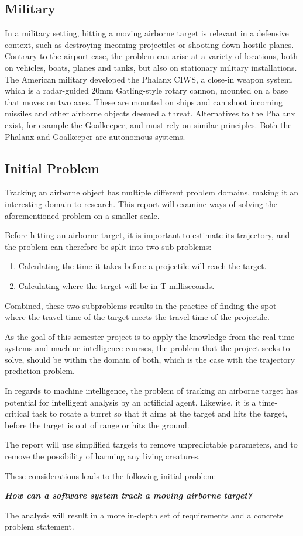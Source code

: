 \subsection{Military}
In a military setting, hitting a moving airborne target is relevant in a defensive context, such as destroying incoming projectiles or shooting down hostile planes.
Contrary to the airport case, the problem can arise at a variety of locations, both on vehicles, boats, planes and tanks, but also on stationary military installations.
The American military developed the Phalanx CIWS, a close-in weapon system, which is a radar-guided 20mm Gatling-style rotary cannon, mounted on a base that moves on two axes.
These are mounted on ships and can shoot incoming missiles and other airborne objects deemed a threat.
Alternatives to the Phalanx exist, for example the Goalkeeper, and must rely on similar principles.
Both the Phalanx and Goalkeeper are autonomous systems.

\subsection{Initial Problem}
Tracking an airborne object has multiple different problem domains, making it an interesting domain to research.
This report will examine ways of solving the aforementioned problem on a smaller scale.

Before hitting an airborne target, it is important to estimate its trajectory, and the problem can therefore be split into two sub-problems:
\begin{enumerate}
  \item Calculating the time it takes before a projectile will reach the target.
  \item Calculating where the target will be in T milliseconds.
\end{enumerate}
Combined, these two subproblems results in the practice of finding the spot where the travel time of the target meets the travel time of the projectile.

As the goal of this semester project is to apply the knowledge from the real time systems and machine intelligence courses, the problem that the project seeks to solve, should be within the domain of both, which is the case with the trajectory prediction problem.

In regards to machine intelligence, the problem of tracking an airborne target has potential for intelligent analysis by an artificial agent.
Likewise, it is a time-critical task to rotate a turret so that it aims at the target and hits the target, before the target is out of range or hits the ground.

The report will use simplified targets to remove unpredictable parameters, and to remove the possibility of harming any living creatures.

These considerations leads to the following initial problem:
\label{key:initialProblem}
\begin{center}
  \textit{\textbf{How can a software system track a moving airborne target?}}
\end{center}
The analysis will result in a more in-depth set of requirements and a concrete problem statement.
